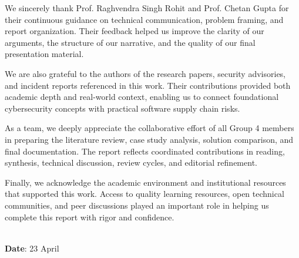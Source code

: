 \clearpage

\begin{acknowledgements}
\addchaptertocentry{\acknowledgementname} 
We sincerely thank Prof. Raghvendra Singh Rohit and Prof. Chetan Gupta for their continuous guidance on technical communication, problem framing, and report organization. Their feedback helped us improve the clarity of our arguments, the structure of our narrative, and the quality of our final presentation material.

We are also grateful to the authors of the research papers, security advisories, and incident reports referenced in this work. Their contributions provided both academic depth and real-world context, enabling us to connect foundational cybersecurity concepts with practical software supply chain risks.

As a team, we deeply appreciate the collaborative effort of all Group 4 members in preparing the literature review, case study analysis, solution comparison, and final documentation. The report reflects coordinated contributions in reading, synthesis, technical discussion, review cycles, and editorial refinement.

Finally, we acknowledge the academic environment and institutional resources that supported this work. Access to quality learning resources, open technical communities, and peer discussions played an important role in helping us complete this report with rigor and confidence.
 \vspace{4cm}

\begin{minipage}[b]{0.5\textwidth}
	\begin{flushleft}
		~\\ {\bf Date}: 23 April
	\end{flushleft}
\end{minipage}
\begin{minipage}[b]{0.45\textwidth}
	\begin{flushright}
		~\\ \authorname
	 \end{flushright}
\end{minipage}

\end{acknowledgements}
